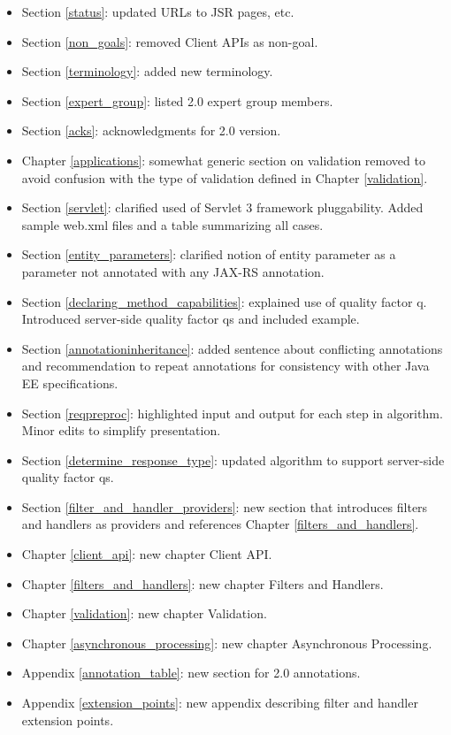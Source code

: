 \begin{itemize}
\item Section \ref{status}: updated URLs to JSR pages, etc.
\item Section \ref{non_goals}: removed Client APIs as non-goal.
\item Section \ref{terminology}: added new terminology.
\item Section \ref{expert_group}: listed 2.0 expert group members.
\item Section \ref{acks}: acknowledgments for 2.0 version.
\item Chapter \ref{applications}: somewhat generic section on validation removed to avoid confusion with the type of validation defined in Chapter \ref{validation}.
\item Section \ref{servlet}: clarified used of Servlet 3 framework pluggability. Added sample web.xml files and a table summarizing all cases.
\item Section \ref{entity_parameters}: clarified notion of entity parameter as a parameter not annotated with any JAX-RS annotation.
\item Section \ref{declaring_method_capabilities}: explained use of quality factor q. Introduced server-side quality factor qs and included example.
\item Section \ref{annotationinheritance}: added sentence about conflicting annotations and recommendation to repeat annotations for consistency with other Java EE specifications.
\item Section \ref{reqpreproc}: highlighted input and output for each step in algorithm. Minor edits to simplify presentation.
\item Section \ref{determine_response_type}: updated algorithm to support server-side quality factor qs.
\item Section \ref{filter_and_handler_providers}: new section that introduces filters and handlers as providers and references Chapter \ref{filters_and_handlers}.
\item Chapter \ref{client_api}: new chapter Client API.
\item Chapter \ref{filters_and_handlers}: new chapter Filters and Handlers.
\item Chapter \ref{validation}: new chapter Validation.
\item Chapter \ref{asynchronous_processing}: new chapter Asynchronous Processing.
\item Appendix \ref{annotation_table}: new section for 2.0 annotations.
\item Appendix \ref{extension_points}: new appendix describing filter and handler extension points.
\end{itemize}

